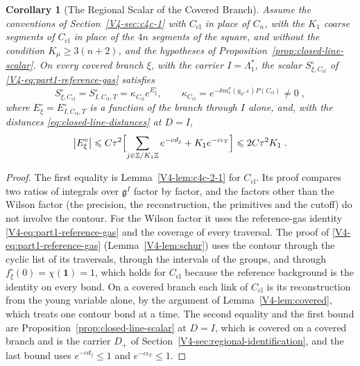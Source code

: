 \documentclass[11pt]{article}
\newcommand{\id}{\mathbf 1}
\numberwithin{equation}{section}
\newtheorem{corollary}[theorem]{Corollary}
\theoremstyle{remark}
\theoremstyle{plain}
\begin{document}
\begin{corollary}[The Regional Scalar of the Covered Branch]\label{cor:closed-line-branch}
Assume the conventions of Section~\ref{V4-sec:c4c-1} with $C_{\mathrm{cl}}$ in place of $C_n$, with the $K_1$ coarse segments of $C_{\mathrm{cl}}$ in place of the $4n$ segments of the square, and without the condition $K_{\mu}\geqslant 3(n+2)$, and the hypotheses of Proposition~\ref{prop:closed-line-scalar}. On every covered branch $\xi$, with the carrier $I=\Lambda_1^*$, the scalar $S^{\circ}_{\xi,C_{\mathrm{cl}}}$ of \eqref{V4-eq:part1-reference-gas} satisfies
\begin{equation}\label{eq:closed-line-branch}
    S^{\circ}_{\xi,C_{\mathrm{cl}}}= S^{\circ}_{I,C_{\mathrm{cl}},T}=\kappa_{C_{\mathrm{cl}}}e^{E^{\circ}_{\xi}},
    \qquad \kappa_{C_{\mathrm{cl}}}= e^{-\delta m^{\sigma}_v(g_0,\varepsilon)P(C_{\mathrm{cl}})}\neq0\;,
\end{equation}
where $E^{\circ}_{\xi}= E^{\circ}_{I,C_{\mathrm{cl}},T}$ is a function of the branch through $I$ alone, and, with the distances \eqref{eq:closed-line-distances} at $D= I$,
\begin{equation}\label{eq:closed-line-branch-bound}
    \bigl| E^{\circ}_{\xi}\bigr|\leqslant C\tau^2\Bigl[\sum_{j\in\mathbb Z/K_1\mathbb Z}e^{-cd_j}+K_1e^{-c\iota_T}\Bigr]\leqslant 2C\tau^2K_1\;.
\end{equation}
\end{corollary}

\begin{proof}
The first equality is Lemma~\ref{V4-lem:c4c-2-1} for $C_{\mathrm{cl}}$. Its proof compares two ratios of integrals over $\mathfrak g^I$ factor by factor, and the factors other than the Wilson factor (the precision, the reconstruction, the primitives and the cutoff) do not involve the contour. For the Wilson factor it uses the reference-gas identity \eqref{V4-eq:part1-reference-gas} and the coverage of every traversal. The proof of \eqref{V4-eq:part1-reference-gas} (Lemma~\ref{V4-lem:schur}) uses the contour through the cyclic list of its traversals, through the intervals of the groups, and through $f^{\circ}_{\xi}(0)=\chi(\id)=1$, which holds for $C_{\mathrm{cl}}$ because the reference background is the identity on every bond. On a covered branch each link of $C_{\mathrm{cl}}$ is its reconstruction from the young variable alone, by the argument of Lemma~\ref{V4-lem:covered}, which treats one contour bond at a time. The second equality and the first bound are Proposition~\ref{prop:closed-line-scalar} at $D= I$, which is covered on a covered branch and is the carrier $D_+$ of Section~\ref{V4-sec:regional-identification}, and the last bound uses $e^{-cd_j}\leqslant 1$ and $e^{-c\iota_T}\leqslant 1$.
\end{proof}
\end{document}
